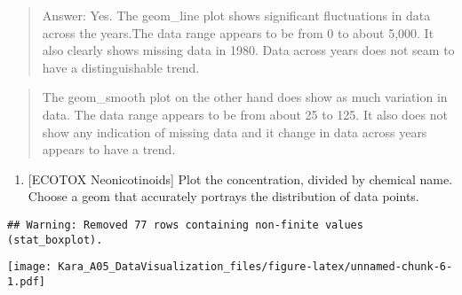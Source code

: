 \documentclass[]{article}
\newenvironment{Shaded}{\begin{snugshade}}{\end{snugshade}}
\newcommand{\KeywordTok}[1]{\textcolor[rgb]{0.13,0.29,0.53}{\textbf{#1}}}
\newcommand{\DataTypeTok}[1]{\textcolor[rgb]{0.13,0.29,0.53}{#1}}
\newcommand{\DecValTok}[1]{\textcolor[rgb]{0.00,0.00,0.81}{#1}}
\newcommand{\StringTok}[1]{\textcolor[rgb]{0.31,0.60,0.02}{#1}}
\newcommand{\CommentTok}[1]{\textcolor[rgb]{0.56,0.35,0.01}{\textit{#1}}}
\newcommand{\OperatorTok}[1]{\textcolor[rgb]{0.81,0.36,0.00}{\textbf{#1}}}
\newcommand{\NormalTok}[1]{#1}
\providecommand{\tightlist}{%
  \setlength{\itemsep}{0pt}\setlength{\parskip}{0pt}}
\begin{document}
\begin{quote}
Answer: Yes. The geom\_line plot shows significant fluctuations in data
across the years.The data range appears to be from 0 to about 5,000. It
also clearly shows missing data in 1980. Data across years does not seam
to have a distinguishable trend.
\end{quote}

\begin{quote}
The geom\_smooth plot on the other hand does show as much variation in
data. The data range appears to be from about 25 to 125. It also does
not show any indication of missing data and it change in data across
years appears to have a trend.
\end{quote}

\begin{enumerate}
\def\labelenumi{\arabic{enumi}.}
\setcounter{enumi}{6}
\tightlist
\item
  {[}ECOTOX Neonicotinoids{]} Plot the concentration, divided by
  chemical name. Choose a geom that accurately portrays the distribution
  of data points.
\end{enumerate}

\begin{Shaded}
\end{Shaded}

\begin{verbatim}
## Warning: Removed 77 rows containing non-finite values (stat_boxplot).
\end{verbatim}

\texttt{[image: Kara\_A05\_DataVisualization\_files/figure-latex/unnamed-chunk-6-1.pdf]}
\end{document}

